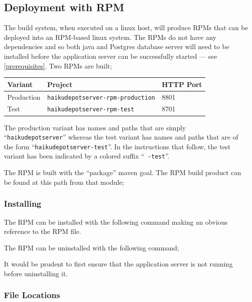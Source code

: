 \subsection{Deployment with RPM}

The build system, when executed on a linux host, will produce RPMs that can be deployed into an RPM-based linux system.  The RPMs do not have any dependencies and so both java and Postgres database server will need to be installed before the application server can be successfully started --- see \ref{prerequisites}.  Two RPMs are built;

\begin{tabular}{|l|l|l|}
\hline
Variant & Project & HTTP Port \\
\hline
Production & {\tt haikudepotserver-rpm-production} & 8801 \\
Test & {\tt haikudepotserver-rpm-test} & 8701 \\
\hline
\end{tabular}

The production variant has names and paths that are simply ``{\tt haikudepotserver}'' whereas the test variant has names and paths that are of the form ``{\tt haikudepotserver-test}''.  In the instructions that follow, the test variant has been indicated by a colored suffix ``{\tt\color{magenta} -test}''.

The RPM is built with the ``package'' maven goal.  The RPM build product can be found at this path from that module;


\subsubsection{Installing}

The RPM can be installed with the following command making an obvious reference to the RPM file.


The RPM can be uninstalled with the following command;


It would be prudent to first ensure that the application server is not running before uninstalling it.

\subsubsection{File Locations}

